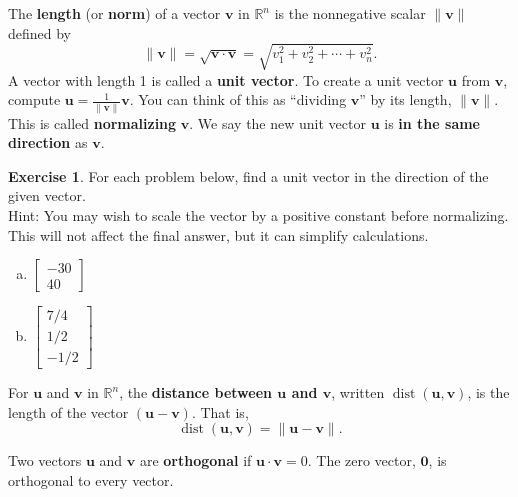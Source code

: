 \documentclass[10pt]{book}
\newcommand{\boxcolor}{gray!30}
\newenvironment{boxdef}{\begin{mdframed}[backgroundcolor=\boxcolor,linewidth=0pt,nobreak=true]}{\end{mdframed}}
\theoremstyle{definition}
\newtheorem{exercise}{Exercise}[section]
\newcommand{\R}{\mathbb{R}}
\newcommand{\vect}[1]{\ensuremath{\boldsymbol{\mathbf{#1}}}}
\DeclareMathOperator{\dist}{dist}
\begin{document}
\begin{boxdef}
	The \textbf{length} (or \textbf{norm}) of a vector $\vect{v}$ in $\R^n$ is the nonnegative scalar $\|\vect{v}\|$ defined by
	$$ \|\vect{v}\| = \sqrt{\vect{v}\cdot\vect{v}} = \sqrt{v_1^2+v_2^2+\cdots+v_n^2}. $$
	A vector with length 1 is called a \textbf{unit vector}. To create a unit vector $\vect{u}$ from $\vect{v}$, compute $\vect{u}=\frac{1}{\|\vect{v}\|}\vect{v}$. You can think of this as ``dividing $\vect{v}$'' by its length, $\|\vect{v}\|$. This is called \textbf{normalizing} $\vect{v}$. We say the new unit vector $\vect{u}$ is \textbf{in the same direction} as $\vect{v}$.
\end{boxdef}


\begin{exercise} %
	For each problem below, find a unit vector in the direction of the given vector. \\
	Hint: You may wish to scale the vector by a positive constant before normalizing. This will not affect the final answer, but it can simplify calculations.
	\begin{multicols}{2}
		\begin{enumerate}[(a)]
			\item $\begin{bmatrix}-30\\40\end{bmatrix}$
			\columnbreak
			\item $\begin{bmatrix}7/4\\1/2\\-1/2\end{bmatrix}$
		\end{enumerate}
	\end{multicols}
\end{exercise}
\vfill


\newpage


\begin{boxdef}
	For $\vect{u}$ and $\vect{v}$ in $\R^n$, the \textbf{distance between $\boldsymbol{\vect{u}}$ and $\boldsymbol{\vect{v}}$}, written $\dist(\vect{u},\vect{v})$, is the length of the vector $(\vect{u}-\vect{v})$. That is,
	\vspace{-1ex}
	$$ \dist(\vect{u},\vect{v}) = \| \vect{u}-\vect{v} \|. $$
\end{boxdef}
\vspace{-1em}
\begin{boxdef}
	Two vectors $\vect{u}$ and $\vect{v}$ are \textbf{orthogonal} if $\vect{u}\cdot\vect{v}=0$. The zero vector, $\vect{0}$, is orthogonal to every vector.
\end{boxdef}
\end{document}
